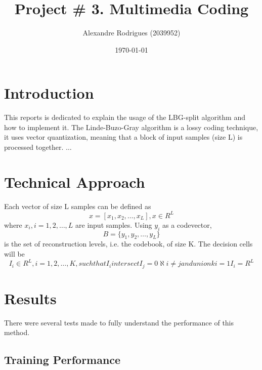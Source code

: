 \documentclass[a4paper, 11pt]{article}
\begin{document}
	
	\title{Project \# 3. Multimedia Coding }
	\author{{\small Alexandre Rodrigues (2039952)}}
	\date{\today}
	\maketitle
	
	\section{Introduction}
		This reports is dedicated to explain the usage of the LBG-split algorithm and how to implement it.
		The Linde-Buzo-Gray algorithm is a lossy coding technique, it uses vector quantization, meaning that a block of input samples (size L) is processed together.
		$\ldots$
	
	\section{Technical Approach}
		Each vector of size L samples can be defined as
		\begin{equation}
			x = [x_1, x_2, \ldots, x_L], x \in R^L
		\end{equation}
		where $x_i, i=1,2,\ldots,L$ are input samples. 
		Using $y_i $ as a codevector, 
		\begin{equation}
			B =  \{y_1, y_2, \ldots, y_L\}
		\end{equation} 
		is the set of reconstruction levels, i.e. the codebook, of size K.
		The decision cells will be
		\begin{equation}
			I_i \in R^L, i = 1, 2, \ldots, K, such that I_i intersect I_j = 0 \aleph i \neq j and union k i=1 I_i = R^L
		\end{equation} 
		
	
	\section{Results}
		There were several tests made to fully understand the performance of this method.
		
		\subsection{Training Performance}
		
\end{document}
